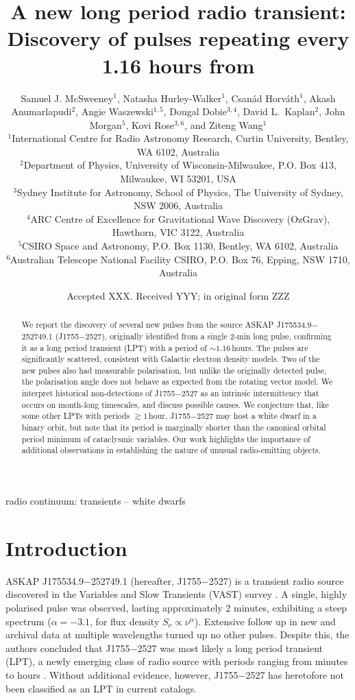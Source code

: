 \documentclass[fleqn,usenatbib]{mnras}
\title[1.16-hr-repeating pulses from \src{}]{A new long period radio transient: Discovery of pulses repeating every 1.16 hours from \srcfull{}}
\author[S. J. McSweeney et al.]{
Samuel J. McSweeney$^{1}$,
Natasha Hurley-Walker$^{1}$,
Csan\'{a}d Horv\'{a}th$^{1}$,
Akash Anumarlapudi$^{2}$,
\newauthor
Angie Waszewski$^{1,5}$,
Dougal Dobie$^{3,4}$,
David L.~Kaplan$^{2}$,
John Morgan$^{5}$,
Kovi Rose$^{3,6}$,
and Ziteng Wang$^{1}$
\\
$^{1}$International Centre for Radio Astronomy Research, Curtin University, Bentley, WA 6102, Australia\\
$^{2}$Department of Physics, University of Wisconsin-Milwaukee, P.O. Box 413, Milwaukee, WI 53201, USA\\
$^{3}$Sydney Institute for Astronomy, School of Physics, The University of Sydney, NSW 2006, Australia\\
$^{4}$ARC Centre of Excellence for Gravitational Wave Discovery (OzGrav), Hawthorn, VIC 3122, Australia\\
$^{5}$CSIRO Space and Astronomy, P.O. Box 1130, Bentley, WA 6102, Australia\\
$^{6}$Australian Telescope National Facility CSIRO, P.O. Box 76, Epping, NSW 1710, Australia\\
}
\date{Accepted XXX. Received YYY; in original form ZZZ}
\newcommand{\src}{J1755$-$2527}
\newcommand{\srcfull}{ASKAP J175534.9$-$252749.1}
\begin{document}
\label{firstpage}
\pagerange{\pageref{firstpage}--\pageref{lastpage}}
\maketitle

\begin{abstract}
We report the discovery of several new pulses from the source \srcfull{} (\src{}), originally identified from a single 2-min long pulse, confirming it as a long period transient (LPT) with a period of ${\sim}1.16\,$hours. The pulses are significantly scattered, consistent with Galactic electron density models. Two of the new pulses also had measurable polarisation, but unlike the originally detected pulse, the polarisation angle does not behave as expected from the rotating vector model. We interpret historical non-detections of \src{} as an intrinsic intermittency that occurs on month-long timescales, and discuss possible causes. We conjecture that, like some other LPTs with periods $\gtrsim 1\,$hour, \src{} may host a white dwarf in a binary orbit, but note that its period is marginally shorter than the canonical orbital period minimum of cataclysmic variables. Our work highlights the importance of additional observations in establishing the nature of unusual radio-emitting objects.
\end{abstract}

\begin{keywords}
radio continuum: transients -- white dwarfs
\end{keywords}



\section{Introduction} \label{sec:introduction}

\srcfull{} (hereafter, \src{}) is a transient radio source \citep[][hereafter ]{2024MNRAS.535..909D} discovered in the Variables and Slow Transients (VAST) survey \citep{2013PASA...30....6M}.
A single, highly polarised pulse was observed, lasting approximately 2 minutes, exhibiting a steep spectrum ($\alpha = -3.1$, for flux density $S_\nu\propto\nu^\alpha$).
Extensive follow up in new and archival data at multiple wavelengths turned up no other pulses.
Despite this, the authors concluded that \src{} was most likely a long period transient (LPT), a newly emerging class of radio source with periods ranging from minutes to hours \citep[see e.g.][]{2022Natur.601..526H,2023Natur.619..487H,2024NatAs...8.1159C}.
Without additional evidence, however, \src{} has heretofore not been classified as an LPT in current catalogs.
\end{document}
